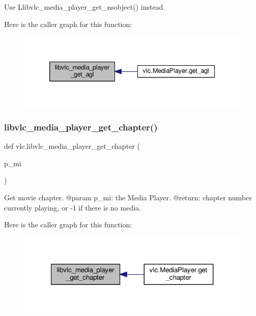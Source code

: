 \begin{DoxyVerb}\deprecated Use L{libvlc_media_player_get_nsobject}() instead.
\end{DoxyVerb}
 Here is the caller graph for this function\+:
\nopagebreak
\begin{figure}[H]
\begin{center}
\leavevmode
\includegraphics[width=339pt]{namespacevlc_a801a636edb9f5b1a8b3095f7feb10aa6_icgraph}
\end{center}
\end{figure}
\mbox{\label{namespacevlc_aa17d018cd364f0d9248f7dacf0ce6686}} 
\subsubsection{\texorpdfstring{libvlc\+\_\+media\+\_\+player\+\_\+get\+\_\+chapter()}{libvlc\_media\_player\_get\_chapter()}}
{\footnotesize\ttfamily def vlc.\+libvlc\+\_\+media\+\_\+player\+\_\+get\+\_\+chapter (\begin{DoxyParamCaption}\item[{}]{p\+\_\+mi }\end{DoxyParamCaption})}

\begin{DoxyVerb}Get movie chapter.
@param p_mi: the Media Player.
@return: chapter number currently playing, or -1 if there is no media.
\end{DoxyVerb}
 Here is the caller graph for this function\+:
\nopagebreak
\begin{figure}[H]
\begin{center}
\leavevmode
\includegraphics[width=321pt]{namespacevlc_aa17d018cd364f0d9248f7dacf0ce6686_icgraph}
\end{center}
\end{figure}
\mbox{\label{namespacevlc_aff9bc2c045b943e08689f0880af3c9ff}} 
